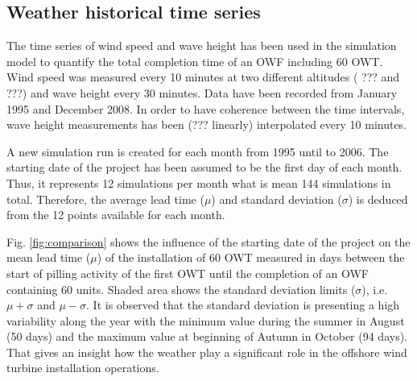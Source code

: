 \subsection{Weather historical time series}
The time series of wind speed and wave height has been used in the simulation model to quantify the total completion time of an OWF including 60 OWT. Wind speed was measured every 10 minutes at two different altitudes ( ??? and ???) and wave height every 30 minutes. Data have been recorded from January 1995 and December 2008. In order to have coherence between the time intervals, wave height measurements has been (??? linearly) interpolated every 10 minutes.

A new simulation run is created for each month from 1995 until to 2006. The starting date of the project has been assumed to be the first day of each month. Thus, it represents 12 simulations per month what is mean 144 simulations in total. Therefore, the average lead time ($\mu$) and standard deviation ($\sigma$) is deduced from the 12 points available for each month.

Fig. \ref{fig:comparison} shows the influence of the starting date of the project on the mean lead time ($\mu$) of the installation of 60 OWT measured in days between the start of pilling activity of the first OWT until the completion of an OWF containing 60 units. Shaded area shows the standard deviation limits ($\sigma$), i.e. $\mu + \sigma$ and $\mu - \sigma$. It is observed that the standard deviation is presenting a high variability along the year with the minimum value during the summer in August (50 days) and the maximum value at beginning of Autumn in October (94 days). That gives an insight how the weather play a significant role in the offshore wind turbine installation operations.